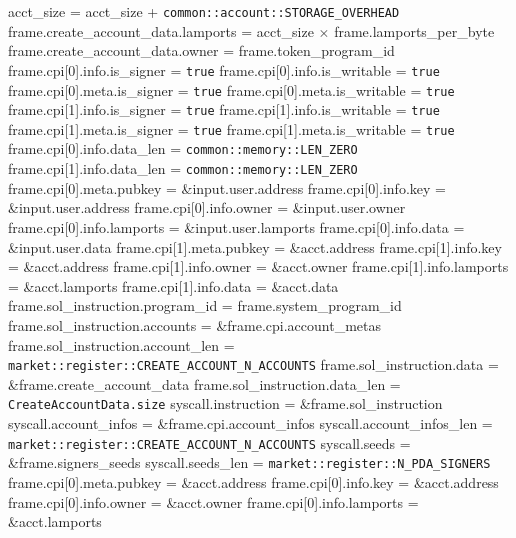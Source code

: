 \begin{algorithm}
\begin{algorithmic}
  \STATE acct\_size = acct\_size + \texttt{common::account::STORAGE\_OVERHEAD}
  \STATE frame.create\_account\_data.lamports =
    acct\_size $\times$ frame.lamports\_per\_byte
  \STATE frame.create\_account\_data.owner = frame.token\_program\_id
  \STATE frame.cpi[0].info.is\_signer = \texttt{true}
  \STATE frame.cpi[0].info.is\_writable = \texttt{true}
  \STATE frame.cpi[0].meta.is\_signer = \texttt{true}
  \STATE frame.cpi[0].meta.is\_writable = \texttt{true}
  \STATE frame.cpi[1].info.is\_signer = \texttt{true}
  \STATE frame.cpi[1].info.is\_writable = \texttt{true}
  \STATE frame.cpi[1].meta.is\_signer = \texttt{true}
  \STATE frame.cpi[1].meta.is\_writable = \texttt{true}
  \STATE frame.cpi[0].info.data\_len = \texttt{common::memory::LEN\_ZERO}
  \STATE frame.cpi[1].info.data\_len = \texttt{common::memory::LEN\_ZERO}
  \STATE frame.cpi[0].meta.pubkey = \&input.user.address
  \STATE frame.cpi[0].info.key = \&input.user.address
  \STATE frame.cpi[0].info.owner = \&input.user.owner
  \STATE frame.cpi[0].info.lamports = \&input.user.lamports
  \STATE frame.cpi[0].info.data = \&input.user.data
  \STATE frame.cpi[1].meta.pubkey = \&acct.address
  \STATE frame.cpi[1].info.key = \&acct.address
  \STATE frame.cpi[1].info.owner = \&acct.owner
  \STATE frame.cpi[1].info.lamports = \&acct.lamports
  \STATE frame.cpi[1].info.data = \&acct.data
  \STATE frame.sol\_instruction.program\_id = frame.system\_program\_id
  \STATE frame.sol\_instruction.accounts = \&frame.cpi.account\_metas
  \STATE frame.sol\_instruction.account\_len =
    \texttt{market::register::CREATE\_ACCOUNT\_N\_ACCOUNTS}
  \STATE frame.sol\_instruction.data = \&frame.create\_account\_data
  \STATE frame.sol\_instruction.data\_len = \texttt{CreateAccountData.size}
  \STATE syscall.instruction = \&frame.sol\_instruction
  \STATE syscall.account\_infos = \&frame.cpi.account\_infos
  \STATE syscall.account\_infos\_len =
    \texttt{market::register::CREATE\_ACCOUNT\_N\_ACCOUNTS}
  \STATE syscall.seeds = \&frame.signers\_seeds
  \STATE syscall.seeds\_len = \texttt{market::register::N\_PDA\_SIGNERS}
  \STATE {}
  \STATE frame.cpi[0].meta.pubkey = \&acct.address
  \STATE frame.cpi[0].info.key = \&acct.address
  \STATE frame.cpi[0].info.owner = \&acct.owner
  \STATE frame.cpi[0].info.lamports = \&acct.lamports

\end{algorithmic}
\end{algorithm}
